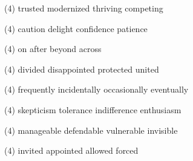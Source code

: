 \begin{tasks}(4)
	\task trusted
	\task modernized
	\task thriving
	\task competing
\end{tasks}
\item
\begin{tasks}(4)
	\task caution
	\task delight
	\task confidence
	\task patience
\end{tasks}
\item
\begin{tasks}(4)
	\task on
	\task after
	\task beyond
	\task across
\end{tasks}
\item
\begin{tasks}(4)
	\task divided
	\task disappointed
	\task protected
	\task united
\end{tasks}
\item
\begin{tasks}(4)
	\task frequently
	\task incidentally
	\task occasionally
	\task eventually
\end{tasks}
\item
\begin{tasks}(4)
	\task skepticism
	\task tolerance
	\task indifference
	\task enthusiasm
\end{tasks}
\item
\begin{tasks}(4)
	\task manageable
	\task defendable
	\task vulnerable
	\task invisible
\end{tasks}
\item
\begin{tasks}(4)
	\task invited
	\task appointed
	\task allowed
	\task forced
\end{tasks}